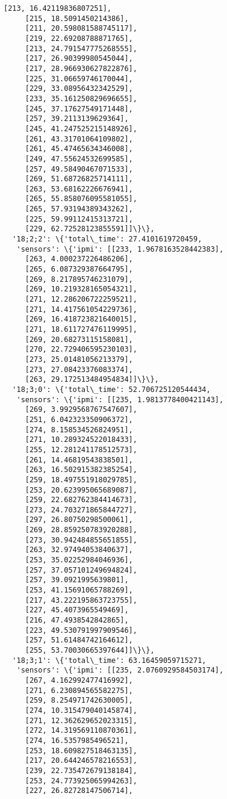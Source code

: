 \documentclass[11pt]{article}
\begin{document}
\begin{tcolorbox}[breakable, size=fbox, boxrule=.5pt, pad at break*=1mm, opacityfill=0]
\begin{Verbatim}[commandchars=\\\{\}]
     [213, 16.42119836807251],
     [215, 18.5091450214386],
     [211, 20.598081588745117],
     [219, 22.69208788871765],
     [213, 24.791547775268555],
     [217, 26.90399980545044],
     [217, 28.966930627822876],
     [225, 31.06659746170044],
     [229, 33.08956432342529],
     [233, 35.161250829696655],
     [245, 37.17627549171448],
     [257, 39.2113139629364],
     [245, 41.247525215148926],
     [261, 43.31701064109802],
     [261, 45.47465634346008],
     [249, 47.55624532699585],
     [257, 49.58490467071533],
     [269, 51.68726825714111],
     [263, 53.68162226676941],
     [265, 55.858076095581055],
     [265, 57.93194389343262],
     [225, 59.99112415313721],
     [229, 62.72528123855591]]\}\},
  '18;2;2': \{'total\_time': 27.4101619720459,
   'sensors': \{'ipmi': [[233, 1.9678163528442383],
     [263, 4.000237226486206],
     [265, 6.087329387664795],
     [269, 8.217895746231079],
     [269, 10.219328165054321],
     [271, 12.286206722259521],
     [271, 14.417561054229736],
     [269, 16.418723821640015],
     [271, 18.611727476119995],
     [269, 20.68273115158081],
     [270, 22.729406595230103],
     [273, 25.01481056213379],
     [273, 27.08423376083374],
     [263, 29.172513484954834]]\}\},
  '18;3;0': \{'total\_time': 52.706725120544434,
   'sensors': \{'ipmi': [[235, 1.9813778400421143],
     [269, 3.9929568767547607],
     [251, 6.042323350906372],
     [274, 8.158534526824951],
     [271, 10.289324522018433],
     [255, 12.281241178512573],
     [261, 14.46819543838501],
     [263, 16.502915382385254],
     [259, 18.497551918029785],
     [253, 20.623995065689087],
     [259, 22.682762384414673],
     [273, 24.703271865844727],
     [297, 26.80750298500061],
     [269, 28.859250783920288],
     [273, 30.942484855651855],
     [263, 32.97494053840637],
     [253, 35.02252984046936],
     [257, 37.057101249694824],
     [257, 39.0921995639801],
     [253, 41.15691065788269],
     [217, 43.222195863723755],
     [227, 45.4073965549469],
     [216, 47.4938542842865],
     [223, 49.530791997909546],
     [257, 51.61484742164612],
     [255, 53.70030665397644]]\}\},
  '18;3;1': \{'total\_time': 63.16459059715271,
   'sensors': \{'ipmi': [[235, 2.0760929584503174],
     [267, 4.162992477416992],
     [271, 6.230894565582275],
     [259, 8.254971742630005],
     [274, 10.315479040145874],
     [271, 12.362629652023315],
     [272, 14.319569110870361],
     [274, 16.5357985496521],
     [253, 18.609827518463135],
     [217, 20.644246578216553],
     [239, 22.735472679138184],
     [253, 24.773925065994263],
     [227, 26.82728147506714],

\end{Verbatim}
\end{tcolorbox}
\end{document}
